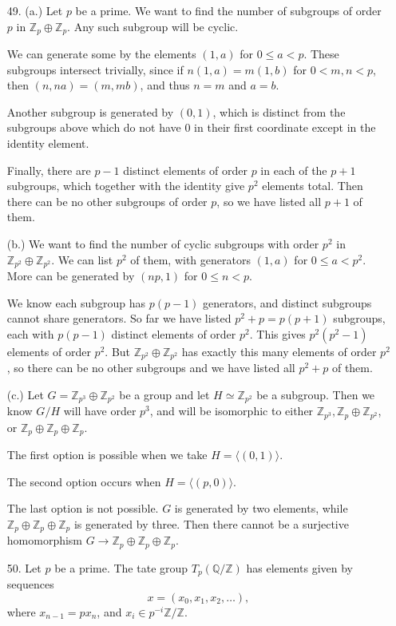 \documentclass[11pt, reqno]{article}
\theoremstyle{plain}
\theoremstyle{definition}
\theoremstyle{remark}
\newcommand{\ZZ}{\mathbb{Z}}
\newcommand{\QQ}{\mathbb{Q}}
\begin{document}
\begin{enumerate}
    \item[49.] (a.) Let $p$ be a prime. We want to find the number of subgroups of order $p$ in $\ZZ_p\oplus \ZZ_p$.
    Any such subgroup will be cyclic. 

    We can generate some by the elements $(1,a)$ for $0 \leq a < p$. These subgroups intersect trivially,
    since if $n(1, a) = m(1, b)$ for $0 < m, n < p$, then $(n, na) = (m, mb)$, and thus $n = m$ and $a = b$. 

    Another subgroup is generated by $(0, 1)$, which is distinct from the subgroups above which do not have
    $0$ in their first coordinate except in the identity element. 

    Finally, there are $p - 1$ distinct elements of order $p$ in each of the $p + 1$ subgroups, which together 
    with the identity give $p^2$ elements total. Then there can be no other subgroups of order $p$,
    so we have listed all $p+1$ of them. 

    (b.) We want to find the number of cyclic subgroups with order $p^2$ in $\ZZ_{p^2} \oplus \ZZ_{p^2}$. 
    We can list $p^2$ of them, with generators $(1, a)$ for $0 \leq a < p^2$. 
    More can be generated by $(np, 1)$ for $0 \leq n < p$. 

    We know each subgroup has $p(p-1)$ generators, and distinct subgroups cannot share generators. So far we have listed
    $p^2 + p = p(p+1)$ subgroups, each with $p(p-1)$ distinct elements of order $p^2$. This gives $p^2(p^2 - 1)$ 
    elements of order $p^2$. But $\ZZ_{p^2} \oplus \ZZ_{p^2}$ has exactly this many elements of order $p^2$, so 
    there can be no other subgroups and we have listed all $p^2 + p$ of them. 

    (c.) Let $G = \ZZ_{p^3}\oplus \ZZ_{p^2}$ be a group and let $H \simeq \ZZ_{p^2}$ be a subgroup. Then we know 
    $G/H$ will have order $p^3$, and will be isomorphic to either $\ZZ_{p^3}, \ZZ_{p}\oplus \ZZ_{p^2}$, or $\ZZ_p\oplus\ZZ_p\oplus\ZZ_p$.

    The first option is possible when we take $H = \langle (0,1)\rangle$.

    The second option occurs when $H = \langle (p,0)\rangle$. 

    The last option is not possible. $G$ is generated by two elements, while $\ZZ_p \oplus\ZZ_p\oplus\ZZ_p$ is generated
    by three. Then there cannot be a surjective homomorphism $G \rightarrow \ZZ_p \oplus\ZZ_p\oplus\ZZ_p$.
    
    \item[50.] Let $p$ be a prime. The tate group $T_p(\QQ/\ZZ)$ has elements given by sequences
    \[
        x = (x_0, x_1, x_2, \dots),
    \]
    where $x_{n-1} = px_{n}$, and $x_i \in p^{-i} \ZZ/\ZZ$.


\end{enumerate}
\end{document}
